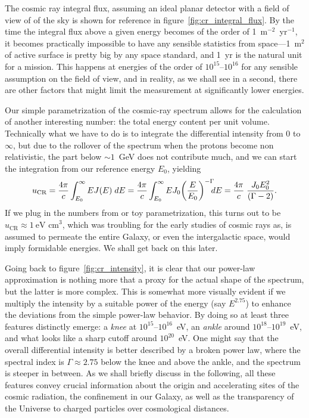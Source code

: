 The cosmic ray integral flux, assuming an ideal planar detector with a field of
view of  of the sky is shown for reference in figure~\ref{fig:cr_integral_flux}.
By the time the integral flux above a given energy becomes of the order
of 1~m$^{-2}$~yr$^{-1}$, it becomes practically impossible to have any sensible
statistics from space---1~m$^2$ of active surface is pretty big by any space standard,
and 1~yr is the natural unit for a mission. This happens at energies of the order
of $10^{15}$--$10^{16}$ for any sensible assumption on the field of view, and in
reality, as we shall see in a second, there are other factors that might limit
the measurement at significantly lower energies.

Our simple parametrization of the cosmic-ray spectrum allows for the calculation
of another interesting number: the total energy content per unit volume.
Technically what we have to do is to integrate the differential intensity from
$0$ to $\infty$, but due to the rollover of the spectrum when the protons become
non relativistic, the part below $\sim 1$~GeV does not contribute much,
and we can start the integration from our reference energy $E_0$, yielding
\begin{align}
  u_\text{CR} = \frac{4\pi}{c} \int_{E_0}^\infty E J(E)  \;d{E} =
  \frac{4\pi}{c} \int_{E_0}^\infty E J_0 \qty(\frac{E}{E_0})^{-\Gamma} \!\!\!\! \;d{E} =
  \frac{4\pi}{c} \; \frac{J_0 E_0^2}{(\Gamma - 2)}.
\end{align}
If we plug in the numbers from or toy parametrization, this turns out to be
$u_\text{CR} \approx 1~\text{eV~cm}^3$, which was troubling for the early studies
of cosmic rays as, is assumed to permeate the entire Galaxy, or even the
intergalactic space, would imply formidable energies. We shall get back on this
later.

Going back to figure~\ref{fig:cr_intensity}, it is clear that our power-law
approximation is nothing more that a proxy for the actual shape of the spectrum,
but the latter is more complex. This is somewhat more visually evident if we
multiply the intensity by a suitable power of the energy (say $E^{2.75}$) to
enhance the deviations from the simple power-law behavior. By doing so at least
three features distinctly emerge: a \emph{knee} at $10^{15}$--$10^{16}$~eV,
an \emph{ankle} around $10^{18}$--$10^{19}$~eV, and what looks like a sharp cutoff
around $10^{20}$~eV. One might say that the overall differential intensity is
better described by a broken power law, where the spectral index is $\Gamma \approx 2.75$
below the knee and above the ankle, and the spectrum is steeper in between.
As we shall briefly discuss in the following, all these features convey crucial
information about the origin and accelerating sites of the cosmic radiation, the
confinement in our Galaxy, as well as the transparency of the Universe to charged
particles over cosmological distances.

